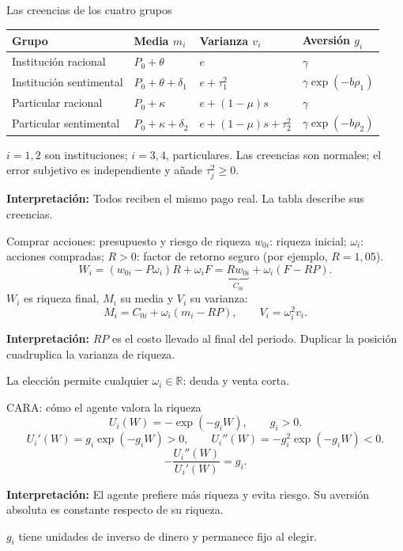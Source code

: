 \documentclass[aspectratio=169,11pt]{beamer}
\newcommand{\idea}[1]{\par\medskip\textbf{Interpretación:} #1}
\begin{document}
\begin{frame}{Las creencias de los cuatro grupos}
\small
\begin{center}
\begin{tabular}{llll}
\toprule
Grupo & Media \(m_i\) & Varianza \(v_i\) & Aversión \(g_i\)\\
\midrule
Institución racional & \(P_0+\theta\) & \(e\) & \(\gamma\)\\[0.1cm]
Institución sentimental & \(P_0+\theta+\delta_1\) & \(e+\tau_1^2\) & \(\gamma\exp(-b\rho_1)\)\\[0.1cm]
Particular racional & \(P_0+\kappa\) & \(e+(1-\mu)s\) & \(\gamma\)\\[0.1cm]
Particular sentimental & \(P_0+\kappa+\delta_2\) & \(e+(1-\mu)s+\tau_2^2\) & \(\gamma\exp(-b\rho_2)\)\\
\bottomrule
\end{tabular}
\end{center}
\normalsize
\(i=1,2\) son instituciones; \(i=3,4\), particulares. Las creencias son
normales; el error subjetivo es independiente y añade \(\tau_j^2\geq0\).
\idea{Todos reciben el mismo pago real. La tabla describe sus creencias.}
\end{frame}

\begin{frame}{Comprar acciones: presupuesto y riesgo de riqueza}
\small
\(w_{0i}\): riqueza inicial; \(\omega_i\): acciones compradas;
\(R>0\): factor de retorno seguro (por ejemplo, \(R=1{,}05\)).
\[
W_i=(w_{0i}-P\omega_i)R+\omega_iF
=\underbrace{Rw_{0i}}_{C_{0i}}+\omega_i(F-RP).
\]
\(W_i\) es riqueza final, \(M_i\) su media y \(V_i\) su varianza:
\[
M_i=C_{0i}+\omega_i(m_i-RP),\qquad
V_i=\omega_i^2v_i.
\]
\normalsize
\idea{\(RP\) es el costo llevado al final del periodo.
Duplicar la posición cuadruplica la varianza de riqueza.}
\small\medskip\par
La elección permite cualquier \(\omega_i\in\mathbb R\): deuda y venta corta.
\end{frame}

\begin{frame}{CARA: cómo el agente valora la riqueza}
\[
 U_i(W)=-\exp(-g_iW),\qquad g_i>0.
\]
\[
 U_i'(W)=g_i\exp(-g_iW)>0,\qquad
 U_i''(W)=-g_i^2\exp(-g_iW)<0.
\]
\[
 -\frac{U_i''(W)}{U_i'(W)}=g_i.
\]
\idea{El agente prefiere más riqueza y evita riesgo.
Su aversión absoluta es constante respecto de su riqueza.}
\small\medskip\par
\(g_i\) tiene unidades de inverso de dinero y permanece fijo al elegir.
\end{frame}
\end{document}
